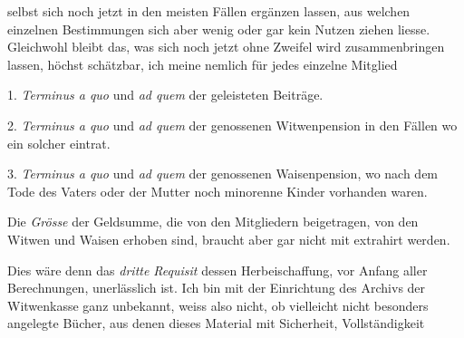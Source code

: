 selbst sich noch jetzt in den meisten Fällen ergänzen lassen, aus welchen einzelnen Bestimmungen sich aber wenig oder gar kein Nutzen ziehen liesse. Gleichwohl bleibt das, was sich noch jetzt ohne Zweifel wird zusammenbringen lassen, höchst schätzbar, ich meine nemlich für jedes einzelne Mitglied

1. \textit{Terminus a quo} und \textit{ad quem} der geleisteten Beiträge.

2. \textit{Terminus a quo} und \textit{ad quem} der genossenen Witwenpension in den Fällen wo ein solcher eintrat.

3. \textit{Terminus a quo} und \textit{ad quem} der genossenen Waisenpension, wo nach dem Tode des Vaters oder der Mutter noch minorenne Kinder vorhanden waren.

Die \textit{Grösse} der Geldsumme, die von den Mitgliedern beigetragen, von den Witwen und Waisen erhoben sind, braucht aber gar nicht mit extrahirt werden.

Dies wäre denn das \textit{dritte Requisit} dessen Herbeischaffung, vor Anfang aller Berechnungen, unerlässlich ist. Ich bin mit der Einrichtung des Archivs der Witwenkasse ganz unbekannt, weiss also nicht, ob vielleicht nicht besonders angelegte Bücher, aus denen dieses Material mit Sicherheit, Vollständigkeit
